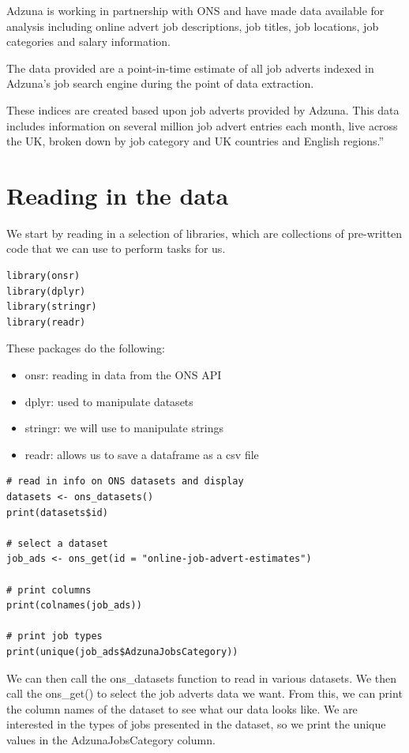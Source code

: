 \documentclass[
]{book}
\providecommand{\tightlist}{%
  \setlength{\itemsep}{0pt}\setlength{\parskip}{0pt}}
\begin{document}
Adzuna is working in partnership with ONS and have made data available for analysis including online advert job descriptions, job titles, job locations, job categories and salary information.

The data provided are a point-in-time estimate of all job adverts indexed in Adzuna's job search engine during the point of data extraction.

These indices are created based upon job adverts provided by Adzuna. This data includes information on several million job advert entries each month, live across the UK, broken down by job category and UK countries and English regions.''

\hypertarget{reading-in-the-data}{%
\section{Reading in the data}\label{reading-in-the-data}}

We start by reading in a selection of libraries, which are collections of pre-written code that we can use to perform tasks for us.

\begin{verbatim}
library(onsr)
library(dplyr)
library(stringr)
library(readr)
\end{verbatim}

These packages do the following:

\begin{itemize}
\tightlist
\item
  onsr: reading in data from the ONS API
\item
  dplyr: used to manipulate datasets
\item
  stringr: we will use to manipulate strings
\item
  readr: allows us to save a dataframe as a csv file
\end{itemize}

\begin{verbatim}
# read in info on ONS datasets and display
datasets <- ons_datasets()
print(datasets$id)

# select a dataset
job_ads <- ons_get(id = "online-job-advert-estimates")

# print columns
print(colnames(job_ads))

# print job types
print(unique(job_ads$AdzunaJobsCategory))
\end{verbatim}

We can then call the ons\_datasets function to read in various datasets. We then call the ons\_get() to select the job adverts data we want. From this, we can print the column names of the dataset to see what our data looks like. We are interested in the types of jobs presented in the dataset, so we print the unique values in the AdzunaJobsCategory column.
\end{document}
